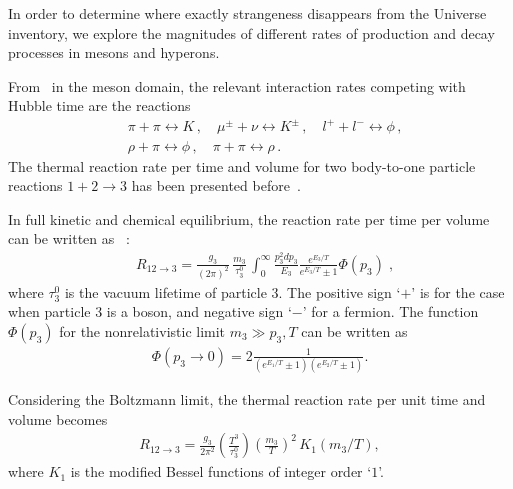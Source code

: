 In order to determine where exactly strangeness disappears from the Universe inventory, we explore the magnitudes of different rates of production and decay processes in mesons and hyperons.
 
From~ in the meson domain, the relevant interaction rates competing with Hubble time are the reactions
\begin{align}
 &\pi+\pi\leftrightarrow K\,,\quad\mu^\pm+\nu\leftrightarrow K^\pm\,,\quad l^++l^-\leftrightarrow\phi\,,\\
 &\rho+\pi\leftrightarrow\phi\,,\quad \pi+\pi\leftrightarrow\rho\,.
\end{align}
The thermal reaction rate per time and volume for two body-to-one particle reactions $1+2\rightarrow 3$ has been presented before~\cite{Koch:1986ud,Kuznetsova:2008jt,Kuznetsova:2010pi}. 

In full kinetic and chemical equilibrium, the reaction rate per time per volume can be written as~\cite{Kuznetsova:2010pi} :
\begin{align}
&R_{12\to 3}=\frac{g_3}{(2\pi)^2}\,\frac{m_3}{\tau^0_3}\,\int^\infty_0\frac{p^2_3dp_3}{E_3}\frac{e^{E_3/T}}{e^{E_3/T}\pm1}\Phi(p_3)\;,
\end{align}
where $\tau^0_3$ is the vacuum lifetime of particle $3$. The positive sign `$+$' is for the case when particle $3$ is a boson, and negative sign `$-$' for a fermion. The function $\Phi(p_3)$ for the nonrelativistic limit $m_3\gg p_3,T$ can be written as 
\begin{align}
\Phi(p_3\to0)=2\frac{1}{(e^{E_1/T}\pm1)(e^{E_2/T}\pm1)}.
\end{align}

Considering the Boltzmann limit, the thermal reaction rate per unit time and volume becomes
\begin{align}
\label{Thermal_Rate}
R_{12\rightarrow3}=\frac{g_3}{2\pi^2}\left(\frac{T^3}{\tau^0_3}\right)\left(\frac{m_3}{T}\right)^2\,K_1(m_3/T),
\end{align}
where $K_1$ is the modified Bessel functions of integer order `$1$'. 

